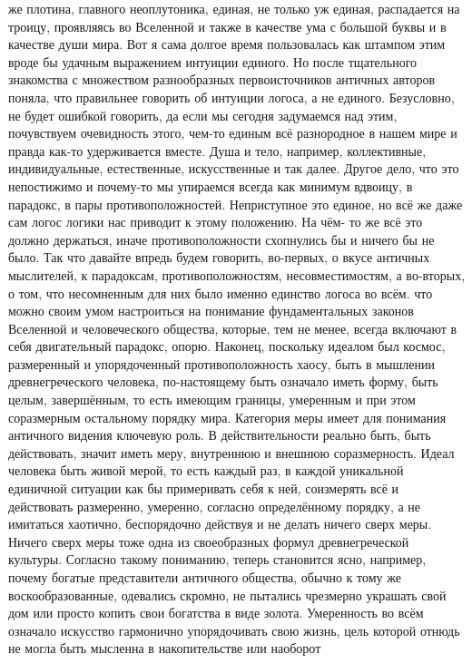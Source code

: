 же плотина, главного неоплутоника, единая, не только уж единая, распадается на
троицу, проявляясь во Вселенной и также в качестве ума с большой буквы и в
качестве души мира. Вот я сама долгое время пользовалась как штампом этим вроде
бы удачным выражением интуиции единого. Но после тщательного знакомства с
множеством разнообразных первоисточников античных авторов поняла, что правильнее
говорить об интуиции логоса, а не единого. Безусловно, не будет ошибкой
говорить, да если мы сегодня задумаемся над этим, почувствуем очевидность этого,
чем-то единым всё разнородное в нашем мире и правда как-то удерживается вместе.
Душа и тело, например, коллективные, индивидуальные, естественные, искусственные
и так далее. Другое дело, что это непостижимо и почему-то мы упираемся всегда
как минимум вдвоицу, в парадокс, в пары противоположностей. Неприступное это
единое, но всё же даже сам логос логики нас приводит к этому положению. На чём-
то же всё это должно держаться, иначе противоположности схопнулись бы и ничего
бы не было. Так что давайте впредь будем говорить, во-первых, о вкусе античных
мыслителей, к парадоксам, противоположностям, несовместимостям, а во-вторых, о
том, что несомненным для них было именно единство логоса во всём. что можно
своим умом настроиться на понимание фундаментальных законов Вселенной и
человеческого общества, которые, тем не менее, всегда включают в себя
двигательный парадокс, опорю. Наконец, поскольку идеалом был космос, размеренный
и упорядоченный противоположность хаосу, быть в мышлении древнегреческого
человека, по-настоящему быть означало иметь форму, быть целым, завершённым, то
есть имеющим границы, умеренным и при этом соразмерным остальному порядку мира.
Категория меры имеет для понимания античного видения ключевую роль. В
действительности реально быть, быть действовать, значит иметь меру, внутреннюю и
внешнюю соразмерность. Идеал человека быть живой мерой, то есть каждый раз, в
каждой уникальной единичной ситуации как бы примеривать себя к ней, соизмерять
всё и действовать размеренно, умеренно, согласно определённому порядку, а не
имитаться хаотично, беспорядочно действуя и не делать ничего сверх меры. Ничего
сверх меры тоже одна из своеобразных формул древнегреческой культуры. Согласно
такому пониманию, теперь становится ясно, например, почему богатые представители
античного общества, обычно к тому же воскообразованные, одевались скромно, не
пытались чрезмерно украшать свой дом или просто копить свои богатства в виде
золота. Умеренность во всём означало искусство гармонично упорядочивать свою
жизнь, цель которой отнюдь не могла быть мысленна в накопительстве или наоборот
